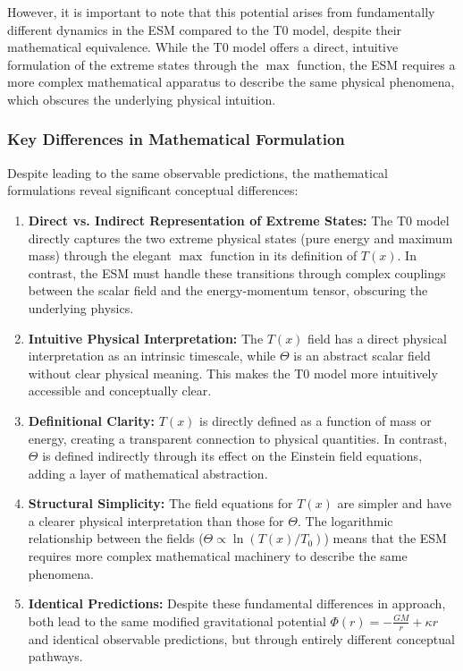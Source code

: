 \documentclass[12pt,a4paper]{article}
\newcommand{\Tfield}{T(x)}
\newcommand{\Tzero}{T_0}
\begin{document}
	However, it is important to note that this potential arises from fundamentally different dynamics in the ESM compared to the T0 model, despite their mathematical equivalence. While the T0 model offers a direct, intuitive formulation of the extreme states through the \(\max\) function, the ESM requires a more complex mathematical apparatus to describe the same physical phenomena, which obscures the underlying physical intuition.
	
	\subsubsection{Key Differences in Mathematical Formulation}
	\label{subsubsec:math_differences}
	
	Despite leading to the same observable predictions, the mathematical formulations reveal significant conceptual differences:
	
	\begin{enumerate}
		\item \textbf{Direct vs. Indirect Representation of Extreme States:} The T0 model directly captures the two extreme physical states (pure energy and maximum mass) through the elegant \(\max\) function in its definition of \(\Tfield\). In contrast, the ESM must handle these transitions through complex couplings between the scalar field and the energy-momentum tensor, obscuring the underlying physics.
		
		\item \textbf{Intuitive Physical Interpretation:} The \(\Tfield\) field has a direct physical interpretation as an intrinsic timescale, while \(\Theta\) is an abstract scalar field without clear physical meaning. This makes the T0 model more intuitively accessible and conceptually clear.
		
		\item \textbf{Definitional Clarity:} \(\Tfield\) is directly defined as a function of mass or energy, creating a transparent connection to physical quantities. In contrast, \(\Theta\) is defined indirectly through its effect on the Einstein field equations, adding a layer of mathematical abstraction.
		
		\item \textbf{Structural Simplicity:} The field equations for \(\Tfield\) are simpler and have a clearer physical interpretation than those for \(\Theta\). The logarithmic relationship between the fields (\(\Theta \propto \ln(\Tfield/\Tzero)\)) means that the ESM requires more complex mathematical machinery to describe the same phenomena.
		
		\item \textbf{Identical Predictions:} Despite these fundamental differences in approach, both lead to the same modified gravitational potential \(\Phi(r) = -\frac{GM}{r} + \kappa r\) and identical observable predictions, but through entirely different conceptual pathways.
	\end{enumerate}
	
\end{document}
